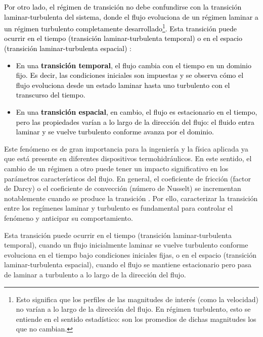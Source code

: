 \textcolor{black}{Por otro lado, el régimen de transición no debe confundirse con la transición laminar-turbulenta del sistema, donde el flujo evoluciona de un régimen laminar a un régimen turbulento completamente desarrollado}\footnote{Esto significa que los perfiles de las magnitudes de interés (como la velocidad) no varían a lo largo de la dirección del flujo. En régimen turbulento, esto se entiende en el sentido estadístico: son los promedios de dichas magnitudes los que no cambian.}. \textcolor{black}{Esta transición puede ocurrir en el tiempo (transición laminar-turbulenta temporal) o en el espacio (transición laminar-turbulenta espacial)} \cite{schlatter2005}:

\begin{itemize}

\item \textcolor{black}{En una \textbf{transición temporal}, el flujo cambia con el tiempo en un dominio fijo. Es decir, las condiciones iniciales son impuestas y se observa cómo el flujo evoluciona desde un estado laminar hasta uno turbulento con el transcurso del tiempo.}

\item \textcolor{black}{En una \textbf{transición espacial}, en cambio, el flujo es estacionario en el tiempo, pero las propiedades varían a lo largo de la dirección del flujo: el fluido entra laminar y se vuelve turbulento conforme avanza por el dominio.
}
\end{itemize}
Este fenómeno es de gran importancia para la ingeniería y la física aplicada ya que está presente en diferentes dispositivos termohidráulicos. En este sentido, el cambio de un régimen a otro puede tener un impacto significativo en los parámetros característicos del flujo. En general, el coeficiente de fricción (factor de Darcy) o el coeficiente de convección (número de Nusselt) se incrementan notablemente cuando se produce la transición \cite{incropera,white}. Por ello, caracterizar la transición entre los regímenes laminar y turbulento es fundamental para controlar el fenómeno y anticipar su comportamiento.

Esta transición puede ocurrir en el tiempo (transición laminar-turbulenta temporal), cuando un flujo inicialmente laminar se vuelve turbulento conforme evoluciona en el tiempo bajo condiciones iniciales fijas, o en el espacio (transición laminar-turbulenta espacial), cuando el flujo se mantiene estacionario pero pasa de laminar a turbulento a lo largo de la dirección del flujo.


